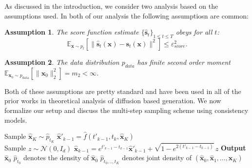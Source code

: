 \documentclass[11pt]{article}
\def\rvx{{\mathbf{x}}}
\def\vs{{\bm{s}}}
\newtheorem{assumption}{Assumption}
\begin{document}
As discussed in the introduction, we consider two analysis based on the assumptions used. In both of our analysis the following assumptiosn are common:

\begin{assumption}
\label{assumption_score_est}
    \textit{The score function estimate} $\{\hat{\vs}_t\}_{1\leq t \leq T}$ obeys for all $t$:
    \begin{equation}
    \label{eq_score_est}
     \mathbb{E}_{\rvx \sim p_{t}}\left [\|\hat{\vs}_{t}(\rvx)- \vs_{t}(\rvx)\|^2 \right ] \leq \varepsilon^2_{score}.
\end{equation}

\end{assumption}

\begin{assumption}
\label{finite_moment}
    The data distribution $p_{data}$ has finite second order moment $\mathbb{E}_{\rvx_0 \sim p_{\text{data}}} \left[ \|\rvx_0\|_2^2 \right] = m_2 < \infty$.
\end{assumption}

\noindent
 Both of these assumptions are pretty standard and have been used in all of the prior works in theoretical analysis of diffusion based generation. We now formalize our setup and discuss the multi-step sampling scheme using consistency models. 

 
\noindent
\begin{algorithm}[H]
\caption{Multi-Step Consistency Generation}
\label{alg:1}
\begin{algorithmic}[1]
\STATE Sample $\hat{\rvx}_K \sim \hat{p}_{t_K}$
    \STATE $\hat{\rvx}'_{k-1} = \hat{f}(t'_{k-1}, t_k, \hat{\rvx}_K)$ \\
    \STATE Sample $z \sim \mathcal{N}(0, I_d)$
    \STATE $\hat{\rvx}_{k-1} = e^{t'_{k-1} - t_{k-1}} \hat{\rvx}'_{k-1} + \sqrt{1 - e^{2(t'_{k-1} - t_{k-1})}}\, z$ 
\ENDFOR
\STATE \textbf{Output} $\hat{\rvx}_0$
\STATE $\hat{p}_{t_0}$ denotes the density of $\hat{\rvx}_0$
\STATE $\hat{p}_{t_0,.., t_K}$ denotes joint density of $(\hat{\rvx}_0, \hat{\rvx}_1, \ldots, \hat{\rvx}_K)$
\end{algorithmic}
\end{algorithm}
\end{document}
